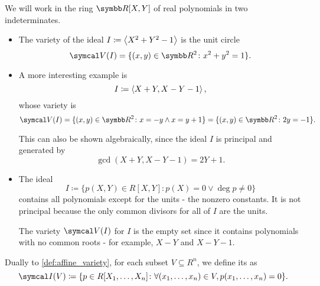\begin{example}\label{ex:affine_varieties}
  We will work in the ring \( \R[X, Y] \) of real polynomials in two indeterminates.

  \begin{itemize}
    \item The variety of the ideal \( I \coloneqq \left\langle X^2 + Y^2 - 1 \right\rangle \) is the unit circle
    \begin{equation*}
      \Cal{V}(I) = \{ (x, y) \in \R^2 \colon x^2 + y^2 = 1 \}.
    \end{equation*}

    \item A more interesting example is
    \begin{equation*}
      I \coloneqq \left\langle X + Y, X - Y - 1 \right\rangle,
    \end{equation*}
    whose variety is
    \begin{equation*}
      \Cal{V}(I) = \{ (x, y) \in \R^2 \colon x = -y \land x = y + 1 \} = \{ (x, y) \in \R^2 \colon 2y = -1 \}.
    \end{equation*}

    This can also be shown algebraically, since the ideal \( I \) is principal and generated by
    \begin{equation*}
      \gcd(X + Y, X - Y - 1) = 2Y + 1.
    \end{equation*}

    \item The ideal
    \begin{equation*}
      I \coloneqq \{ p(X, Y) \in R[X, Y] \colon p(X) = 0 \lor \deg p \neq 0 \}
    \end{equation*}
    contains all polynomials except for the units - the nonzero constants. It is not principal because the only common divisors for all of \( I \) are the units.

    The variety \( \Cal{V}(I) \) for \( I \) is the empty set since it contains polynomials with no common roots - for example, \( X - Y \) and \( X - Y - 1 \).
  \end{itemize}
\end{example}

\begin{definition}\label{def:ideal_of_affine_variety}\cite[70]{Коцев2016}
  Dually to \cref{def:affine_variety}, for each subset \( V \subseteq R^n \), we define its  as
  \begin{equation*}
    \Cal{I}(V) \coloneqq \{ p \in R[X_1, \ldots, X_n] \colon \forall (x_1, \ldots, x_n) \in V, p(x_1, \ldots, x_n) = 0 \}.
  \end{equation*}
\end{definition}

